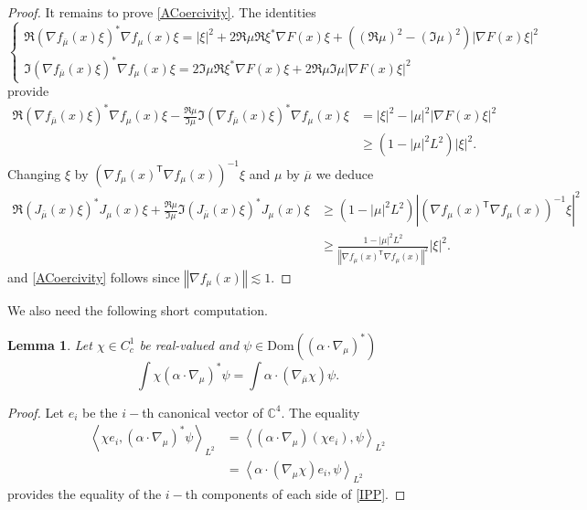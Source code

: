 \documentclass[a4paper, 12pt]{amsart}
\numberwithin{equation}{section}
\newtheorem{lemma}{Lemma}[section]
\newcommand{\C}{\mathbb{C}} %
\newcommand{\lp}{\left(} %
\newcommand{\rp}{\right)} %
\newcommand{\la}{\left\langle} %
\newcommand{\ra}{\right\rangle} %
\newcommand{\lv}{\left\vert} %
\newcommand{\rv}{\right\vert} %
\newcommand{\lV}{\left\Vert} %
\newcommand{\rV}{\right\Vert} %
\newcommand{\Tsf}{\mathsf{T}} %
\newcommand{\Dom}{\mathrm{Dom}} %
\begin{document}
\begin{proof}
    It remains to prove \eqref{ACoercivity}. The identities
    \begin{equation*}
        \left\{
        \begin{array}{ll}
            \Re(\nabla f_{\overline{\mu}}(x)\xi)^*\nabla f_\mu(x)\xi=\lv\xi\rv^2+2\Re\mu\Re\xi^*\nabla F(x)\xi+\lp(\Re\mu)^2-(\Im\mu)^2\rp\lv \nabla F(x)\xi\rv^2\\
            
            \Im(\nabla f_{\overline{\mu}}(x)\xi)^*\nabla f_\mu(x)\xi=2\Im\mu\Re\xi^*\nabla F(x)\xi+2\Re\mu\Im\mu\lv \nabla F(x)\xi\rv^2
        \end{array}
        \right.
    \end{equation*}
    provide
    \begin{align*}
        \Re(\nabla f_{\overline{\mu}}(x)\xi)^*\nabla f_\mu(x)\xi-\frac{\Re\mu}{\Im\mu}\Im(\nabla f_{\overline{\mu}}(x)\xi)^*\nabla f_\mu(x)\xi&=\lv\xi\rv^2-\lv\mu\rv^2\lv \nabla F(x)\xi\rv^2\\
        &\geq\lp1-\lv\mu\rv^2L^2\rp\lv\xi\rv^2.
    \end{align*}
    Changing $\xi$ by $\lp \nabla f_\mu(x)^\Tsf \nabla f_\mu(x)\rp^{-1}\xi$ and $\mu$ by $\overline{\mu}$ we deduce
    \begin{align*}
        \Re(J_{\overline{\mu}}(x)\xi)^*J_\mu(x)\xi+\frac{\Re\mu}{\Im\mu}\Im(J_{\overline{\mu}}(x)\xi)^*J_\mu(x)\xi&\geq\lp1-\lv\mu\rv^2L^2\rp\lv\lp \nabla f_\mu(x)^\Tsf \nabla f_\mu(x)\rp^{-1}\xi\rv^2\\
        &\geq\frac{1-\lv\mu\rv^2L^2}{\lV \nabla f_\mu(x)^\Tsf \nabla f_\mu(x)\rV^2}\lv\xi\rv^2.
    \end{align*}
    and \eqref{ACoercivity} follows since $\lV \nabla f_\mu(x)\rV\lesssim1$.
\end{proof}

We also need the following short computation.

\begin{lemma}
    Let $\chi\in C^1_c$ be real-valued and $\psi\in\Dom((\alpha\cdot\nabla_\mu)^*)$
    \begin{equation}\label{IPP}
        \int\chi(\alpha\cdot\nabla_\mu)^*\psi=\int\alpha\cdot(\nabla_{\overline{\mu}}\chi)\psi.
    \end{equation}
\end{lemma}

\begin{proof} Let $e_i$ be the $i-$th canonical vector of $\C^4$. The equality
    \begin{align*}
        \la\chi e_i,(\alpha\cdot\nabla_\mu)^*\psi\ra_{L^2}&=\la (\alpha\cdot\nabla_\mu)(\chi e_i),\psi\ra_{L^2}\\
        &=\la\alpha\cdot(\nabla_\mu\chi)e_i,\psi\ra_{L^2}
    \end{align*}
    provides the equality of the $i-$th components of each side of \eqref{IPP}.
\end{proof}
\end{document}
